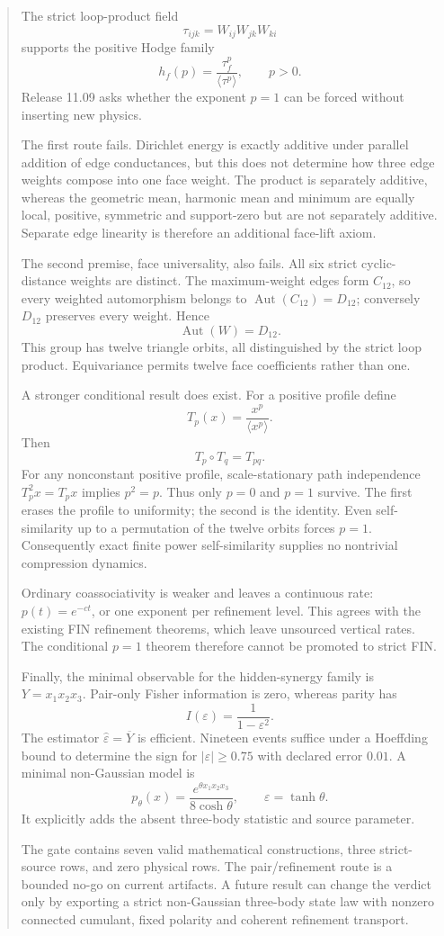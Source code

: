 \documentclass[11pt,a4paper]{article}
\begin{document}
\begin{abstract}
The strict loop-product field
\[
 \tau_{ijk}=W_{ij}W_{jk}W_{ki}
\]
supports the positive Hodge family
\[
 h_f(p)=\frac{\tau_f^p}{\langle\tau^p\rangle},\qquad p>0.
\]
Release 11.09 asks whether the exponent \(p=1\) can be forced without inserting
new physics.

The first route fails.  Dirichlet energy is exactly additive under parallel
addition of edge conductances, but this does not determine how three edge
weights compose into one face weight.  The product is separately additive,
whereas the geometric mean, harmonic mean and minimum are equally local,
positive, symmetric and support-zero but are not separately additive.
Separate edge linearity is therefore an additional face-lift axiom.

The second premise, face universality, also fails.  All six strict
cyclic-distance weights are distinct.  The maximum-weight edges form
\(C_{12}\), so every weighted automorphism belongs to
\(\operatorname{Aut}(C_{12})=D_{12}\); conversely \(D_{12}\) preserves every
weight.  Hence
\[
 \operatorname{Aut}(W)=D_{12}.
\]
This group has twelve triangle orbits, all distinguished by the strict loop
product.  Equivariance permits twelve face coefficients rather than one.

A stronger conditional result does exist.  For a positive profile define
\[
 T_p(x)=\frac{x^p}{\langle x^p\rangle}.
\]
Then
\[
 T_p\circ T_q=T_{pq}.
\]
For any nonconstant positive profile, scale-stationary path independence
\(T_p^2x=T_px\) implies \(p^2=p\).  Thus only \(p=0\) and \(p=1\) survive.
The first erases the profile to uniformity; the second is the identity.  Even
self-similarity up to a permutation of the twelve orbits forces \(p=1\).
Consequently exact finite power self-similarity supplies no nontrivial
compression dynamics.

Ordinary coassociativity is weaker and leaves a continuous rate:
\(p(t)=e^{-ct}\), or one exponent per refinement level.  This agrees with the
existing FIN refinement theorems, which leave unsourced vertical rates.  The
conditional \(p=1\) theorem therefore cannot be promoted to strict FIN.

Finally, the minimal observable for the hidden-synergy family is
\(Y=x_1x_2x_3\).  Pair-only Fisher information is zero, whereas parity has
\[
 I(\varepsilon)=\frac1{1-\varepsilon^2}.
\]
The estimator \(\widehat\varepsilon=\overline Y\) is efficient.  Nineteen
events suffice under a Hoeffding bound to determine the sign for
\(|\varepsilon|\geq0.75\) with declared error \(0.01\).  A minimal
non-Gaussian model is
\[
 p_\theta(x)=\frac{e^{\theta x_1x_2x_3}}{8\cosh\theta},
 \qquad \varepsilon=\tanh\theta.
\]
It explicitly adds the absent three-body statistic and source parameter.

The gate contains seven valid mathematical constructions, three strict-source
rows, and zero physical rows.  The pair/refinement route is a bounded no-go on
current artifacts.  A future result can change the verdict only by exporting a
strict non-Gaussian three-body state law with nonzero connected cumulant, fixed
polarity and coherent refinement transport.
\end{abstract}
\end{document}
